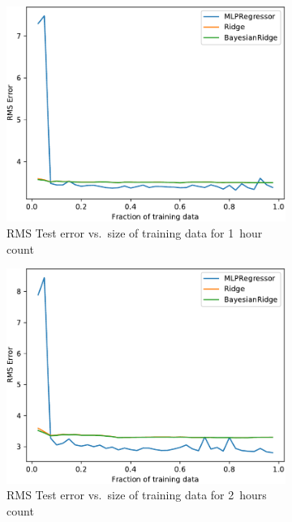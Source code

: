 \clearpage
\begin{figure}[!ht]\centering
    \begin{subfigure}[t]{.47\linewidth}\centering
        \includegraphics[width=0.9\linewidth]{./figures/AplotC1.pdf}
        \caption{RMS Test error vs.~size of training data for 1~hour count}\label{AppAplotC1}
    \end{subfigure}\hfill%
    \begin{subfigure}[t]{.47\linewidth}\centering
        \includegraphics[width=0.9\linewidth]{./figures/AplotC2.pdf}
        \caption{RMS Test error vs.~size of training data for 2~hours count}\label{AppAplotC2}
    \end{subfigure}\\[5pt]
    \begin{subfigure}[t]{.47\linewidth}\centering

\end{subfigure}
\end{figure}
